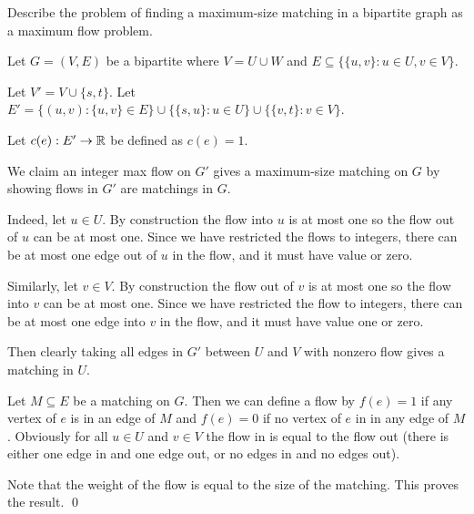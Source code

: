 \documentclass[10pt]{article}
\begin{document}
\begin{problem}[Problem 4.9]
    Describe the problem of finding a maximum-size matching in a bipartite graph as a maximum flow problem.
\end{problem}

\begin{solution}

Let \( G = (V,E) \) be a bipartite where \( V = U\cup W \) and \( E\subseteq \{ \{u,v\} : u\in U, v\in V\} \).

Let \( V' = V\cup\{s,t\} \). Let \( E' = \{ (u,v) : \{u,v\} \in E \}\cup \{ \{s,u\} : u\in U \}\cup\{\{v,t\} : v\in V \} \).

Let \( c(e):E' \to \mathbb{R} \) be defined as \( c(e) = 1 \).

We claim an integer max flow on \( G' \) gives a maximum-size matching on \( G \) by showing flows in \( G' \) are matchings in \( G \).

Indeed, let \( u\in U \). By construction the flow into \( u \) is at most one so the flow out of \( u \) can be at most one. Since we have restricted the flows to integers, there can be at most one edge out of \( u \) in the flow, and it must have value or zero.

Similarly, let \( v\in V \). By construction the flow out of \( v \) is at most one so the flow into \( v \) can be at most one. Since we have restricted the flow to integers, there can be at most one edge into \( v \) in the flow, and it must have value one or zero.

Then clearly taking all edges in \( G' \) between \( U \) and \( V \) with nonzero flow gives a matching in \( U \).

Let \( M\subseteq E \) be a matching on \( G \). Then we can define a flow by \( f(e) = 1 \) if any vertex of \( e \) is in an edge of \( M \) and \( f(e) = 0 \) if no vertex of \( e \) in in any edge of \( M \). Obviously for all \( u\in U \) and \( v\in V \) the flow in is equal to the flow out (there is either one edge in and one edge out, or no edges in and no edges out).

Note that the weight of the flow is equal to the size of the matching. This proves the result. \qed

\end{solution}
\end{document}
